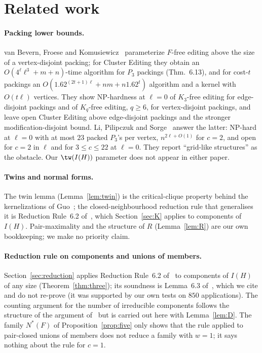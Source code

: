 \section{Related work}\label{sec:related}
\paragraph{Packing lower bounds.} van Bevern, Froese and Komusiewicz~\cite{BFK18} parameterize $F$-free editing above the size of a vertex-disjoint packing; for Cluster Editing they obtain an $O(4^\ell\ell^3+m+n)$-time algorithm for $P_3$ packings (Thm.~6.13), and for cost-$t$ packings an $O(1.62^{(2t+1)\ell}+nm+n1.62^t)$ algorithm and a kernel with $O(t\ell)$ vertices. They show NP-hardness at $\ell=0$ of $K_3$-free editing for edge-disjoint packings and of $K_q$-free editing, $q\ge6$, for vertex-disjoint packings, and leave open Cluster Editing above edge-disjoint packings and the stronger modification-disjoint bound. Li, Pilipczuk and Sorge~\cite{LPS23} answer the latter: NP-hard at $\ell=0$ with at most $23$ packed $P_3$'s per vertex, $n^{2\ell+O(1)}$ for $c=2$, and open for $c=2$ in $\ell$ and for $3\le c\le22$ at $\ell=0$. They report ``grid-like structures'' as the obstacle. Our $\tw(I(H))$ parameter does not appear in either paper.

\paragraph{Twins and normal forms.} The twin lemma (Lemma~\ref{lem:twin}) is the critical-clique property behind the kernelizations of Guo~\cite{Guo09}; the closed-neighbourhood reduction rule that generalises it is Reduction Rule~6.2 of~\cite{BFK18}, which Section~\ref{sec:K} applies to components of $I(H)$. Pair-maximality and the structure of $R$ (Lemma~\ref{lem:R}) are our own bookkeeping; we make no priority claim.

\paragraph{Reduction rule on components and unions of members.} Section~\ref{sec:reduction} applies Reduction Rule~6.2 of~\cite{BFK18} to components of $I(H)$ of any size (Theorem~\ref{thm:three}); its soundness is Lemma~6.3 of~\cite{BFK18}, which we cite and do not re-prove (it was supported by our own tests on $850$ applications). The counting argument for the number of irreducible components follows the structure of the argument of~\cite{BFK18} but is carried out here with Lemma~\ref{lem:D}. The family $N^*(F)$ of Proposition~\ref{prop:five} only shows that the rule applied to pair-closed unions of members does not reduce a family with $w=1$; it says nothing about the rule for $c=1$.


